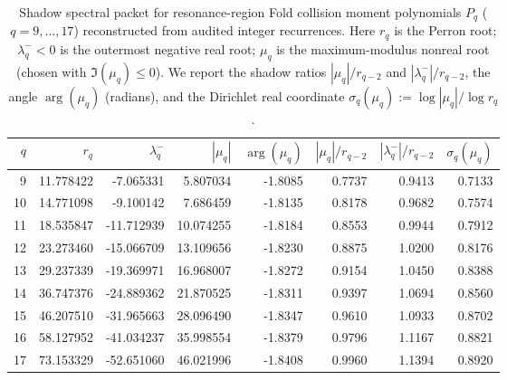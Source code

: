 \begin{table}[H]
\centering
\scriptsize
\setlength{\tabcolsep}{4pt}
\caption{Shadow spectral packet for resonance-region Fold collision moment polynomials $P_q$ ($q=9,\dots,17$) reconstructed from audited integer recurrences. Here $r_q$ is the Perron root; $\lambda_q^{-}<0$ is the outermost negative real root; $\mu_q$ is the maximum-modulus nonreal root (chosen with $\Im(\mu_q)\le 0$). We report the shadow ratios $|\mu_q|/r_{q-2}$ and $|\lambda_q^-|/r_{q-2}$, the angle $\arg(\mu_q)$ (radians), and the Dirichlet real coordinate $\sigma_q(\mu_q):=\log|\mu_q|/\log r_q$.}
\label{tab:fold_collision_shadow_spectral_packet_q9_17}
\begin{tabular}{r r r r r r r r}
\toprule
$q$ & $r_q$ & $\lambda_q^{-}$ & $|\mu_q|$ & $\arg(\mu_q)$ & $|\mu_q|/r_{q-2}$ & $|\lambda_q^-|/r_{q-2}$ & $\sigma_q(\mu_q)$\\
\midrule
9 & 11.778422 & -7.065331 & 5.807034 & -1.8085 & 0.7737 & 0.9413 & 0.7133\\
10 & 14.771098 & -9.100142 & 7.686459 & -1.8135 & 0.8178 & 0.9682 & 0.7574\\
11 & 18.535847 & -11.712939 & 10.074255 & -1.8184 & 0.8553 & 0.9944 & 0.7912\\
12 & 23.273460 & -15.066709 & 13.109656 & -1.8230 & 0.8875 & 1.0200 & 0.8176\\
13 & 29.237339 & -19.369971 & 16.968007 & -1.8272 & 0.9154 & 1.0450 & 0.8388\\
14 & 36.747376 & -24.889362 & 21.870525 & -1.8311 & 0.9397 & 1.0694 & 0.8560\\
15 & 46.207510 & -31.965663 & 28.096490 & -1.8347 & 0.9610 & 1.0933 & 0.8702\\
16 & 58.127952 & -41.034237 & 35.998554 & -1.8379 & 0.9796 & 1.1167 & 0.8821\\
17 & 73.153329 & -52.651060 & 46.021996 & -1.8408 & 0.9960 & 1.1394 & 0.8920\\
\bottomrule
\end{tabular}
\end{table}
